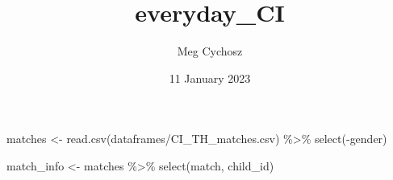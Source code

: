 \documentclass[
]{article}
\title{everyday\_CI}
\author{Meg Cychosz}
\date{11 January 2023}
\newenvironment{Shaded}{\begin{snugshade}}{\end{snugshade}}
\newcommand{\FunctionTok}[1]{\textcolor[rgb]{0.00,0.00,0.00}{#1}}
\newcommand{\NormalTok}[1]{#1}
\newcommand{\OtherTok}[1]{\textcolor[rgb]{0.56,0.35,0.01}{#1}}
\newcommand{\SpecialCharTok}[1]{\textcolor[rgb]{0.00,0.00,0.00}{#1}}
\newcommand{\StringTok}[1]{\textcolor[rgb]{0.31,0.60,0.02}{#1}}
\begin{document}
\maketitle

\begin{Shaded}
\begin{Highlighting}[]
\NormalTok{matches }\OtherTok{\textless{}{-}} \FunctionTok{read.csv}\NormalTok{(}\StringTok{\textquotesingle{}dataframes/CI\_TH\_matches.csv\textquotesingle{}}\NormalTok{) }\SpecialCharTok{\%\textgreater{}\%} 
  \FunctionTok{select}\NormalTok{(}\SpecialCharTok{{-}}\NormalTok{gender)}

\NormalTok{match\_info }\OtherTok{\textless{}{-}}\NormalTok{ matches }\SpecialCharTok{\%\textgreater{}\%} \FunctionTok{select}\NormalTok{(match, child\_id) }
\end{Highlighting}
\end{Shaded}
\end{document}
